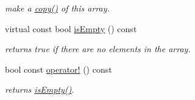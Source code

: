 \begin{DoxyCompactItemize}
\begin{DoxyCompactList}\small\item\em make a \hyperlink{classparray_1_1PointerArray_a3010540e156076377ffd4428b05e1ac2}{copy()} of this array. \end{DoxyCompactList}\item 
\hypertarget{classparray_1_1PointerArray_adf7c87ef3e5b66d11137209d45701975}{virtual const bool \hyperlink{classparray_1_1PointerArray_adf7c87ef3e5b66d11137209d45701975}{is\-Empty} () const }\label{classparray_1_1PointerArray_adf7c87ef3e5b66d11137209d45701975}

\begin{DoxyCompactList}\small\item\em returns true if there are no elements in the array. \end{DoxyCompactList}\item 
\hypertarget{classparray_1_1PointerArray_ac1aa766707215ddeecbf23a0648644c5}{bool const \hyperlink{classparray_1_1PointerArray_ac1aa766707215ddeecbf23a0648644c5}{operator!} () const }\label{classparray_1_1PointerArray_ac1aa766707215ddeecbf23a0648644c5}

\begin{DoxyCompactList}\small\item\em returns \hyperlink{classparray_1_1PointerArray_adf7c87ef3e5b66d11137209d45701975}{is\-Empty()}. \end{DoxyCompactList}\end{DoxyCompactItemize}
